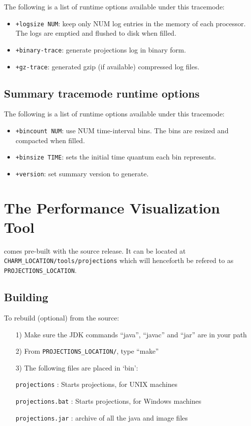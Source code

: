 \documentclass[10pt]{article}
\begin{document}
The following is a list of runtime options available under this tracemode:

\begin{itemize}
\item
{\tt +logsize NUM}:   keep only NUM log entries in the memory of each processor. The logs are emptied and flushed to disk when filled.
\item
{\tt +binary-trace}:  generate projections log in binary form.
\item
{\tt +gz-trace}:      generated gzip (if available) compressed log files.
\end{itemize}

\subsection{Summary tracemode runtime options}
\label{sec::summary runtime options}

The following is a list of runtime options available under this tracemode:

\begin{itemize}
\item
{\tt +bincount NUM}:   use NUM time-interval bins. The bins are resized and compacted when filled.
\item
{\tt +binsize TIME}:   sets the initial time quantum each bin represents.
\item
{\tt +version}:        set summary version to generate.
\end{itemize}

\section{The \projections{} Performance Visualization Tool}
\label{sec::visualization}

\projections{} comes pre-built with the \charmpp{} source release. It can
be located at \\
{\tt CHARM\_LOCATION/tools/projections} which will henceforth be refered 
to as {\tt PROJECTIONS\_LOCATION}.

\subsection{Building \projections{}}

To rebuild \projections{} (optional) from the source:

\begin{enumerate}
\item[1)]
   Make sure the JDK commands ``java'', ``javac'' and ``jar''
   are in your path
\item[2)]
   From {\tt PROJECTIONS\_LOCATION/}, type ``make''
\item[3)]
   The following files are placed in `bin':

      {\tt projections}           : Starts projections, for UNIX machines

      {\tt projections.bat}       : Starts projections, for Windows machines

      {\tt projections.jar}       : archive of all the java and image files
\end{enumerate}
\end{document}
